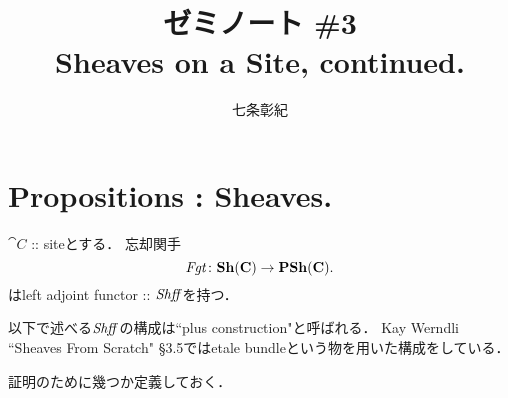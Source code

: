 \documentclass[a4paper, dvipdfmx]{jsarticle}
\begin{document}
\title{ゼミノート \#3 \\ Sheaves on a Site, continued.}
\author{七条彰紀}
\maketitle

\section{Propositions : Sheaves.}
\begin{Thm}\label{thm:Shff}
    $\cat{C}$ :: siteとする．
    忘却関手
    \[ \mathit{Fgt} \colon \mathbf{Sh}(\mathbf{C}) \to \mathbf{PSh}(\mathbf{C}). \]
    はleft adjoint functor :: $\mathit{Shff}$を持つ．
\end{Thm}
\begin{Remark}
    以下で述べる$\mathit{Shff}$の構成は``plus construction"と呼ばれる．
    Kay Werndli ``Sheaves From Scratch" \S3.5ではetale bundleという物を用いた構成をしている．
\end{Remark}

証明のために幾つか定義しておく．
\end{document}
